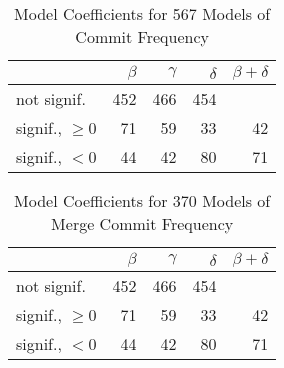 
\begin{table}[t] \centering
\small
  \caption{Model Coefficients for 567 Models of Commit Frequency}
  \label{Table:rddmodels_freq}
\begin{tabular}{ l  r r r r }        
\hline 

 & $\beta$ & $\gamma$ & $\delta$ & $\beta + \delta$ \\ 
 \hline 
 \hline
not signif. & 452 & 466 & 454 & \\
\hline
signif., $\ge 0$ & 71 & 59 & 33 & 42 \\
\hline
signif., $<0$ & 44 & 42 & 80 & 71 \\
\hline
\end{tabular}
\end{table}

\begin{table}[t] \centering
\small
  \caption{Model Coefficients for 370 Models of Merge Commit Frequency}
  \label{Table:rddmodels_merge_freq}
\begin{tabular}{ l  r r r r }        
\hline 

 & $\beta$ & $\gamma$ & $\delta$ & $\beta + \delta$ \\ 
 \hline 
 \hline
not signif. & 452 & 466 & 454 & \\
\hline
signif., $\ge 0$ & 71 & 59 & 33 & 42 \\
\hline
signif., $<0$ & 44 & 42 & 80 & 71 \\
\hline
\end{tabular}
\end{table}